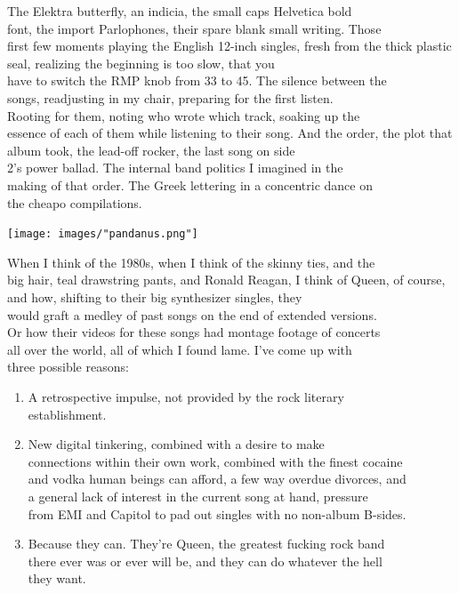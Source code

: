 \documentclass[
]{memoir}
\begin{document}
The Elektra butterfly, an indicia, the small caps Helvetica bold\\
font, the import Parlophones, their spare blank small writing. Those\\
first few moments playing the English 12-inch singles, fresh from the
thick plastic seal, realizing the beginning is too slow, that you\\
have to switch the RMP knob from 33 to 45. The silence between the\\
songs, readjusting in my chair, preparing for the first listen.\\
Rooting for them, noting who wrote which track, soaking up the\\
essence of each of them while listening to their song. And the order,
the plot that album took, the lead-off rocker, the last song on side\\
2's power ballad. The internal band politics I imagined in the\\
making of that order. The Greek lettering in a concentric dance on\\
the cheapo compilations.

\begin{center}\texttt{[image: images/"pandanus.png"]}\end{center}

When I think of the 1980s, when I think of the skinny ties, and the\\
big hair, teal drawstring pants, and Ronald Reagan, I think of Queen, of
course, and how, shifting to their big synthesizer singles, they\\
would graft a medley of past songs on the end of extended versions.\\
Or how their videos for these songs had montage footage of concerts\\
all over the world, all of which I found lame. I've come up with\\
three possible reasons:

\begin{enumerate}
\def\labelenumi{\arabic{enumi}.}
\item
  A retrospective impulse, not provided by the rock literary\\
  establishment.
\item
  New digital tinkering, combined with a desire to make\\
  connections within their own work, combined with the finest cocaine\\
  and vodka human beings can afford, a few way overdue divorces, and\\
  a general lack of interest in the current song at hand, pressure\\
  from EMI and Capitol to pad out singles with no non-album B-sides.
\item
  Because they can. They're Queen, the greatest fucking rock band\\
  there ever was or ever will be, and they can do whatever the hell\\
  they want.
\end{enumerate}
\end{document}
